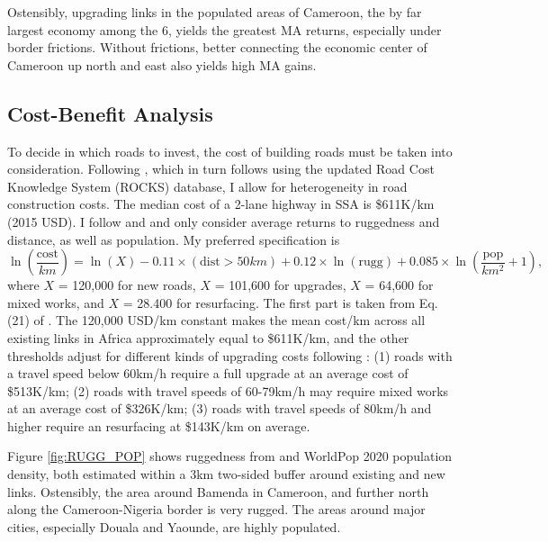 \documentclass[a4paper]{article}
\begin{document}
Ostensibly, upgrading links in the populated areas of Cameroon, the by far largest economy among the 6, yields the greatest MA returns, especially under border frictions. Without frictions, better connecting the economic center of Cameroon up north and east also yields high MA gains.  

\subsection{Cost-Benefit Analysis}

To decide in which roads to invest, the cost of building roads must be taken into consideration. Following \citet{krantz2024optimal}, which in turn follows \citet{collier2016cost} using the updated Road Cost Knowledge System (ROCKS) database, I allow for heterogeneity in road construction costs. The median cost of a 2-lane highway in SSA is \$611K/km (2015 USD). I follow \citet{fajgelbaum2020optimal} and \citet{graff2024spatial} and only consider average returns to ruggedness and distance, as well as population. My preferred specification is 
\begin{equation} \label{eq:COST}
\ln\left(\frac{\text{cost}}{km}\right) = \ln(X) -0.11 \times (\text{dist} > 50km) + 0.12 \times \ln(\text{rugg}) + 0.085 \times \ln\left(\frac{\text{pop}}{km^2}+1\right),
\end{equation}
where $X$ = 120,000 for new roads, $X$ = 101,600 for upgrades, $X$ = 64,600 for mixed works, and $X$ = 28.400 for resurfacing. The first part is taken from Eq. (21) of \citet{fajgelbaum2020optimal}. The 120,000 USD/km constant makes the mean cost/km across all existing links in Africa approximately equal to \$611K/km, and the other thresholds adjust for different kinds of upgrading costs following \citet{krantz2024optimal}: (1) roads with a travel speed below 60km/h require a full upgrade at an average cost of \$513K/km; (2) roads with travel speeds of 60-79km/h may require mixed works at an average cost of \$326K/km; (3) roads with travel speeds of 80km/h and higher require an resurfacing at \$143K/km on average. \newline 

Figure \ref{fig:RUGG_POP} shows ruggedness from \citep{nunn2012ruggedness} and WorldPop 2020 population density, both estimated within a 3km two-sided buffer around existing and new links. Ostensibly, the area around Bamenda in Cameroon, and further north along the Cameroon-Nigeria border is very rugged. The areas around major cities, especially Douala and Yaounde, are highly populated. 
\end{document}

